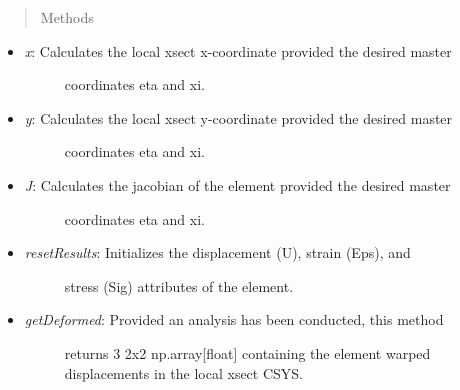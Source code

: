 \documentclass[letterpaper,10pt,english]{sphinxmanual}
\begin{document}
\begin{fulllineitems}
\begin{itemize}
\begin{description}
\end{description}

\end{itemize}
\begin{quote}\begin{description}
\item[{Methods}] \leavevmode
\end{description}\end{quote}
\begin{itemize}
\item {} \begin{description}
\item[{\emph{x}: Calculates the local xsect x-coordinate provided the desired master}] \leavevmode
coordinates eta and xi.

\end{description}

\item {} \begin{description}
\item[{\emph{y}: Calculates the local xsect y-coordinate provided the desired master}] \leavevmode
coordinates eta and xi.

\end{description}

\item {} \begin{description}
\item[{\emph{J}: Calculates the jacobian of the element provided the desired master}] \leavevmode
coordinates eta and xi.

\end{description}

\item {} \begin{description}
\item[{\emph{resetResults}: Initializes the displacement (U), strain (Eps), and}] \leavevmode
stress (Sig) attributes of the element.

\end{description}

\item {} \begin{description}
\item[{\emph{getDeformed}: Provided an analysis has been conducted, this method}] \leavevmode
returns 3 2x2 np.array{[}float{]} containing the element warped
displacements in the local xsect CSYS.

\end{description}


\end{itemize}
\end{fulllineitems}
\end{document}
